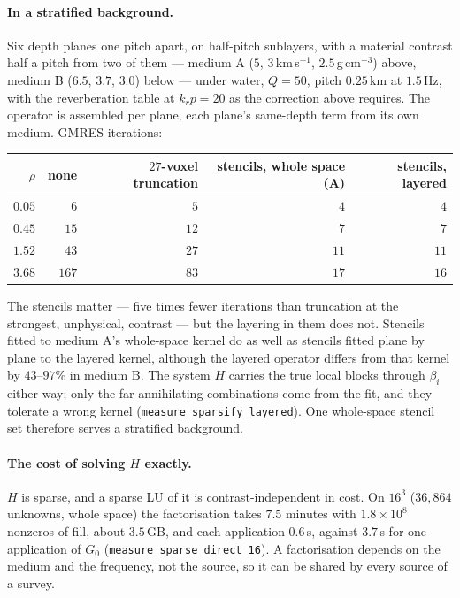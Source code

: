 \documentclass[11pt,a4paper]{article}
\newcommand{\Gz}{G_0}
\begin{document}
\paragraph{In a stratified background.} Six depth planes one pitch apart, on half-pitch
sublayers, with a material contrast half a pitch from two of them --- medium A
($5$, $3$\,km\,s$^{-1}$, $2.5$\,g\,cm$^{-3}$) above, medium B ($6.5$, $3.7$, $3.0$) below ---
under water, $Q = 50$, pitch $0.25$\,km at $1.5$\,Hz, with the reverberation table at
$k_r p = 20$ as the correction above requires. The operator is assembled per plane, each plane's
same-depth term from its own medium. GMRES iterations:
\begin{center}
\begin{tabular}{@{}rrrrr@{}}
\toprule
$\rho$ & none & $27$-voxel truncation & stencils, whole space (A) & stencils, layered \\
\midrule
$0.05$ & $6$ & $5$ & $4$ & $4$\\
$0.45$ & $15$ & $12$ & $7$ & $7$\\
$1.52$ & $43$ & $27$ & $11$ & $11$\\
$3.68$ & $167$ & $83$ & $17$ & $16$\\
\bottomrule
\end{tabular}
\end{center}
The stencils matter --- five times fewer iterations than truncation at the strongest, unphysical,
contrast --- but the layering in them does not. Stencils fitted to medium A's whole-space kernel do as well as
stencils fitted plane by plane to the layered kernel, although the layered operator differs from
that kernel by $43$--$97$\% in medium B. The system $H$ carries the true local blocks through
$\beta_i$ either way; only the far-annihilating combinations come from the fit, and they tolerate
a wrong kernel (\texttt{measure\_sparsify\_layered}). One whole-space stencil set therefore serves
a stratified background.

\paragraph{The cost of solving $H$ exactly.} $H$ is sparse, and a sparse LU of it is
contrast-independent in cost. On $16^3$ ($36{,}864$ unknowns, whole space) the factorisation takes
$7.5$ minutes with $1.8\times10^{8}$ nonzeros of fill, about $3.5$\,GB, and each application
$0.6$\,s, against $3.7$\,s for one application of $\Gz$ (\texttt{measure\_sparse\_direct\_16}). A
factorisation depends on the medium and the frequency, not the source, so it can be shared by
every source of a survey.
\end{document}
